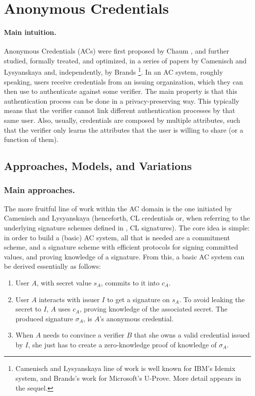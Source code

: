 \section{Anonymous Credentials}
\label{sec:ac}

\paragraph{Main intuition.}
%
Anonymous Credentials (ACs) were first proposed by Chaum \cite{chau85}, and
further studied, formally treated, and optimized, in a series of papers by
Camenisch and Lysyanskaya \cite{cl01,cl02,cl04} and, independently, by Brands
\cite{bran00}\footnote{Camenisch and Lysyanskaya line of work is well known for
  IBM's Idemix system, and Brands's work for Microsoft's U-Prove. More detail
  appears in the sequel.}. In an AC system, roughly speaking, users receive
credentials from an issuing organization, which they can then use to
authenticate against some verifier. The main property is that this
authentication process can be done in a privacy-preserving way. This typically
means that the verifier cannot link different authentication processes by that
same user. Also, usually, credentials are composed by multiple attributes, such
that the verifier only learns the attributes that the user is willing to share
(or a function of them).

\subsection{Approaches, Models, and Variations}
\label{ssec:acapproach}

\subsubsection{Main approaches.}
%
The more fruitful line of work within the AC domain is the one initiated by
Camenisch and Lysyanskaya \cite{cl01,cl02,cl04} (henceforth, CL credentials or,
when referring to the underlying signature schemes defined in \cite{cl02,cl04},
CL signatures). The core idea is simple: in order to build a (basic) AC
system, all that is needed are a commitment scheme, and a signature scheme
with efficient protocols for signing committed values, and proving knowledge
of a signature. From this, a basic AC system can be derived essentially as
follows:

\begin{enumerate}
\item User $A$, with secret value $s_A$, commits to it into $c_A$.
\item User $A$ interacts with issuer $I$ to get a signature on $s_A$. To
  avoid leaking the secret to $I$, $A$ uses $c_A$, proving knowledge of the
  associated secret. The produced signature $\sigma_A$, is $A$'s anonymous
  credential.
\item When $A$ needs to convince a verifier $B$ that she owns a valid credential
  issued by $I$, she just has to create a zero-knowledge proof of knowledge
  of $\sigma_A$.
\end{enumerate}

